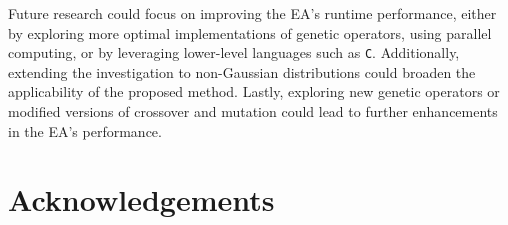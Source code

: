 \documentclass[12pt, centerh1]{article}
\begin{document}
Future research could focus on improving the EA's runtime performance, either by exploring more optimal implementations of genetic operators, using parallel computing, or by leveraging lower-level languages such as \texttt{C}. Additionally, extending the investigation to non-Gaussian distributions could broaden the applicability of the proposed method. Lastly, exploring new genetic operators or modified versions of crossover and mutation could lead to further enhancements in the EA's performance.






{\small 
\section*{Acknowledgements}



}
\end{document}
